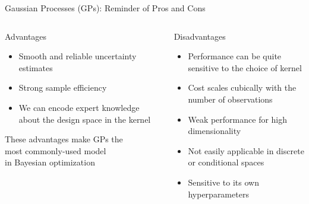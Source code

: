 \begin{frame}[c]{Gaussian Processes (GPs): Reminder of Pros and Cons}

\begin{columns}[T] %
\begin{column}{.48\textwidth}

    \begin{block}{Advantages}
    \begin{itemize}
    	\item Smooth and reliable uncertainty estimates 
		\item Strong sample efficiency
    	\item We can encode expert knowledge about the design space in the kernel 
    \end{itemize}
    \end{block}
\bigskip
\pause
\hspace*{0.5cm}These advantages make GPs the\\
\hspace*{0.5cm}\alert{most commonly-used model\\
\hspace*{0.5cm}in Bayesian optimization}

\end{column}%

\hfill%
\pause

\begin{column}{.48\textwidth}
    \begin{block}{Disadvantages}
    \begin{itemize}
    	\item Performance can be quite sensitive to the choice of kernel
    	\item Cost scales cubically with the number of observations 
    	\item Weak performance for high dimensionality
    	\item Not easily applicable in discrete or conditional spaces 
    	\item Sensitive to its own hyperparameters
    \end{itemize}
\end{block}

\end{column}
\end{columns}

	

\end{frame}
